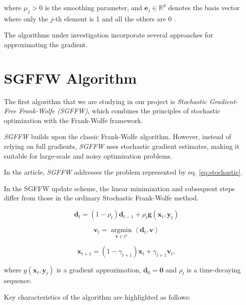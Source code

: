 \begin{multicols}{2}
where $\mu_j>0$ is the smoothing parameter, and $\mathbf{e}_j \in \mathbb{R}^d$ 
denotes the basis vector where only the $j$-th element is 1 and all the others are 0 . 

The algorithms under investigation incorporate several approaches for 
approximating the gradient.

\section{SGFFW Algorithm}

The first algorithm that we are studying in our project is 
\textit{Stochastic Gradient-Free Frank-Wolfe (SGFFW)}, which combines 
the principles of stochastic optimization with the Frank-Wolfe framework.

\textit{SGFFW} builds upon the classic Frank-Wolfe algorithm. However, 
instead of relying on full gradients, \textit{SGFFW} uses stochastic 
gradient estimates, making it suitable for large-scale and noisy 
optimization problems.

In the article, \textit{SGFFW} addresses the problem represented by 
eq. \eqref{eq:stochastic}.

In the SGFFW update scheme, the linear minimization and subsequent steps 
differ from those in the ordinary Stochastic Frank-Wolfe method.

\begin{equation}
    \mathbf{d}_t=\left(1-\rho_t\right) \mathbf{d}_{t-1}+\rho_t \mathbf{g}\left(\mathbf{x}_t, \mathbf{y}_t\right)
\label{eq:sahu-d-update}
\end{equation}
    
\begin{equation}
    \mathbf{v}_t=\underset{\mathbf{v} \in \mathcal{C}}{\operatorname{argmin}}\left\langle\mathbf{d}_t, \mathbf{v}\right\rangle 
\label{eq:sahu-v-update}
\end{equation}

\begin{equation}
    \mathbf{x}_{t+1}=\left(1-\gamma_{t+1}\right) \mathbf{x}_t+\gamma_{t+1} \mathbf{v}_t,
\label{eq:sahu-x-update}
\end{equation}

where $g\left(\mathbf{x}_t, \mathbf{y}_t\right)$ is a gradient approximation,
$\mathbf{d}_0=\mathbf{0}$ and $\rho_t$ is a time-decaying sequence.
 


Key characteristics of the algorithm are highlighted as follows:


\end{multicols}
